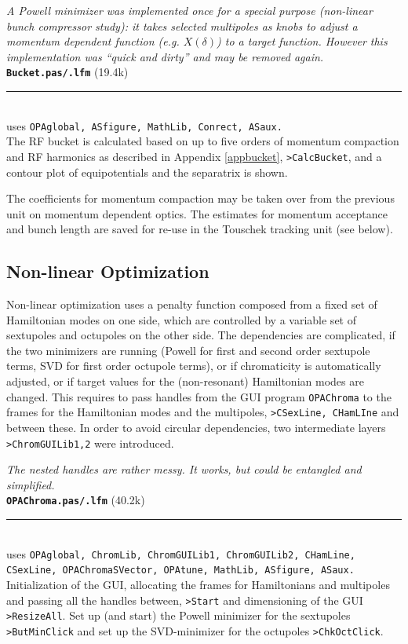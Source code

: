 \documentclass[12pt]{article}
\newcommand\code[1]{{\tt #1}}
\newcommand{\todo}[1]{{\color{red}\em #1}}
\newcommand\opamodule[3]{{\bf \tt #1} #2\\  \rule[3pt]{\textwidth}{0.2pt} \\ {\scriptsize uses \tt  #3}\\[1ex]}
\begin{document}
\todo{A Powell minimizer was implemented once for a special purpose (non-linear bunch compressor study): it takes selected multipoles as knobs to adjust a momentum dependent function (e.g. $X(\delta)$) to a target function. However this implementation was ``quick and dirty'' and may be removed again.}\\


\opamodule{Bucket.pas/.lfm}{(19.4k)}{OPAglobal, ASfigure, MathLib, Conrect, ASaux.}
The RF bucket is calculated based on up to five orders of momentum compaction and RF harmonics as described in Appendix \ref{appbucket}, \code{>CalcBucket}, and a contour plot of equipotentials and the separatrix is shown.

The coefficients for momentum compaction may be taken over from the previous unit on momentum dependent optics. The estimates for momentum acceptance and bunch length are saved for re-use in the Touschek tracking unit (see below).\\

\subsection{Non-linear Optimization}
Non-linear optimization uses a penalty function composed from a fixed set of Hamiltonian modes on one side, which are controlled by a variable set of sextupoles and octupoles on the other side.
The dependencies are complicated, if the two minimizers are running (Powell for first and second order sextupole terms, SVD for first order octupole terms), or if chromaticity is automatically adjusted, or if target values for the (non-resonant) Hamiltonian modes are changed. This requires to pass handles from the GUI program \code{OPAChroma} to the frames for the Hamiltonian modes and the multipoles, \code{>CSexLine, CHamLIne} and between these. In order to avoid circular dependencies, two intermediate layers \code{>ChromGUILib1,2} were introduced.

\todo{The nested handles are rather messy. It works, but could be entangled and simplified.}\\

\opamodule{OPAChroma.pas/.lfm}{(40.2k)}{OPAglobal, ChromLib, ChromGUILib1, ChromGUILib2, CHamLine, CSexLine, OPAChromaSVector, OPAtune, MathLib, ASfigure, ASaux.}
Initialization of the GUI, allocating the frames for Hamiltonians and multipoles and passing all the handles between, \code{>Start} and dimensioning of the GUI \code{>ResizeAll}.
Set up (and start) the Powell minimizer for the sextupoles \code{>ButMinClick} and set up the SVD-minimizer for the octupoles \code{>ChkOctClick}.\\
\end{document}
